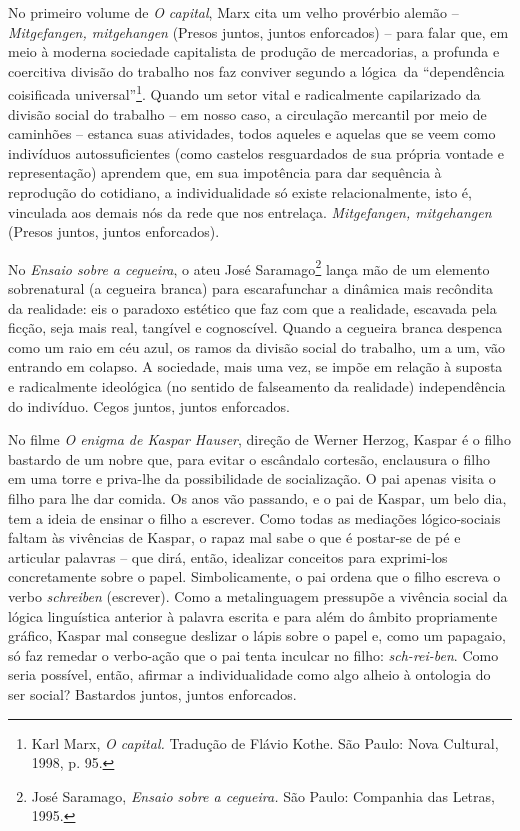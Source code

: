 No primeiro volume de \emph{O capital}, Marx cita um velho provérbio
alemão --\emph{Mitgefangen, mitgehangen} (Presos juntos, juntos
enforcados) -- para falar que, em meio à moderna sociedade capitalista
de produção de mercadorias, a profunda e coercitiva divisão do trabalho
nos faz conviver segundo a lógica~da ``dependência coisificada
universal''\footnote{Karl Marx, \emph{O capital.} Tradução de Flávio
  Kothe. São Paulo: Nova Cultural, 1998, p. 95.}. Quando um setor vital
e radicalmente capilarizado da divisão social do trabalho -- em nosso
caso, a circulação mercantil por meio de caminhões -- estanca suas
atividades, todos aqueles e aquelas que se veem como indivíduos
autossuficientes (como castelos resguardados de sua própria vontade e
representação) aprendem que, em sua impotência para dar sequência à
reprodução do cotidiano, a individualidade só existe relacionalmente,
isto é, vinculada aos demais nós da rede que nos entrelaça.
\emph{Mitgefangen, mitgehangen} (Presos juntos, juntos enforcados).

No \emph{Ensaio sobre a cegueira}, o ateu José Saramago\footnote{José
  Saramago, \emph{Ensaio sobre a cegueira.} São Paulo: Companhia das
  Letras, 1995.} lança mão de um elemento sobrenatural (a cegueira
branca) para escarafunchar a dinâmica mais recôndita da realidade: eis o
paradoxo estético que faz com que a realidade, escavada pela ficção,
seja mais real, tangível e cognoscível. Quando a cegueira branca
despenca como um raio em céu azul, os ramos da divisão social do
trabalho, um a um, vão entrando em colapso. A sociedade, mais uma vez,
se impõe em relação à suposta e radicalmente ideológica (no sentido de
falseamento da realidade) independência do indivíduo. Cegos juntos,
juntos enforcados.

No filme \emph{O enigma de Kaspar Hauser}, direção de Werner Herzog,
Kaspar é o filho bastardo de um nobre que, para evitar o escândalo
cortesão, enclausura o filho em uma torre e priva-lhe da possibilidade
de socialização. O pai apenas visita o filho para lhe dar comida. Os
anos vão passando, e o pai de Kaspar, um belo dia, tem a ideia de
ensinar o filho a escrever. Como todas as mediações lógico-sociais
faltam às vivências de Kaspar, o rapaz mal sabe o que é postar-se de pé
e articular palavras -- que dirá, então, idealizar conceitos para
exprimi-los concretamente sobre o papel. Simbolicamente, o pai ordena
que o filho escreva o verbo \emph{schreiben} (escrever). Como a
metalinguagem pressupõe a vivência social da lógica linguística anterior
à palavra escrita e para além do âmbito propriamente gráfico, Kaspar mal
consegue deslizar o lápis sobre o papel e, como um papagaio, só faz
remedar o verbo-ação que o pai tenta inculcar no filho:
\emph{sch-rei-ben}. Como seria possível, então, afirmar a
individualidade como algo alheio à ontologia do ser social? Bastardos
juntos, juntos enforcados.

